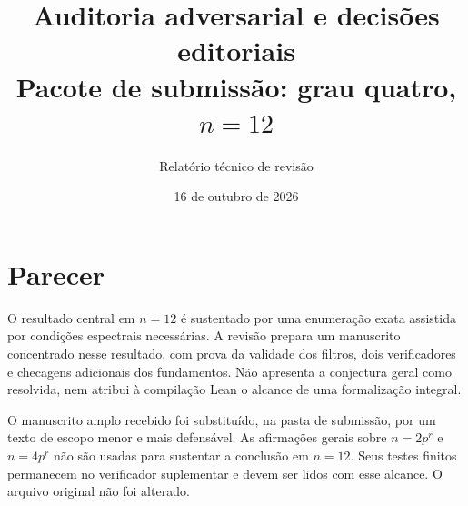 \documentclass[11pt,a4paper]{article}
\title{Auditoria adversarial e decisões editoriais\\Pacote de submissão: grau quatro, $n=12$}
\author{Relatório técnico de revisão}
\date{16 de outubro de 2026}
\begin{document}
\maketitle
\section{Parecer}
O resultado central em $n=12$ é sustentado por uma enumeração exata
assistida por condições espectrais necessárias. A revisão prepara um
manuscrito concentrado nesse resultado, com prova da validade dos filtros,
dois verificadores e checagens adicionais dos fundamentos. Não apresenta
a conjectura geral como resolvida, nem atribui à compilação Lean o alcance
de uma formalização integral.

O manuscrito amplo recebido foi substituído, na pasta de submissão, por
um texto de escopo menor e mais defensável. As afirmações gerais sobre
$n=2p^r$ e $n=4p^r$ não são usadas para sustentar a conclusão em $n=12$.
Seus testes finitos permanecem no verificador suplementar e devem ser
lidos com esse alcance. O arquivo original não foi alterado.
\end{document}
